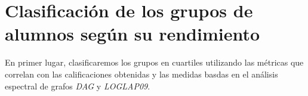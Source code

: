 \chapter{Clasificación de los grupos de alumnos según su rendimiento}

En primer lugar, clasificaremos los grupos en cuartiles utilizando las métricas que correlan con las calificaciones obtenidas y las medidas basdas en el análisis espectral de grafos \emph{DAG} y \emph{LOGLAP09}.



